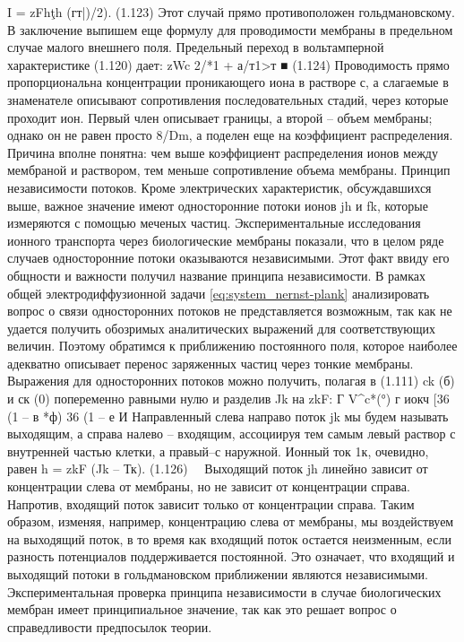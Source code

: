 I = zFh\c th (гт|)/2). (1.123)
Этот случай прямо противоположен гольдмановскому.
В заключение выпишем еще формулу для проводимости мембраны в предельном случае малого внешнего поля. Предельный переход в вольтамперной характеристике (1.120) дает:
zWc
2/*1 + а/т1>т ■ (1.124)
Проводимость прямо пропорциональна концентрации проникающего иона в растворе с, а слагаемые в знаменателе описывают сопротивления последовательных стадий, через которые проходит ион. Первый член описывает границы, а второй -- объем мембраны; однако он не равен просто 8/Dm, а поделен еще на коэффициент распределения. Причина вполне понятна: чем выше коэффициент распределения ионов между мембраной и раствором, тем меньше сопротивление объема мембраны.
Принцип независимости потоков. Кроме электрических характеристик, обсуждавшихся выше, важное значение имеют односторонние потоки ионов jh и fk, которые измеряются с помощью меченых частиц. Экспериментальные исследования ионного транспорта через биологические мембраны показали, что в целом ряде случаев односторонние потоки оказываются независимыми. Этот факт ввиду его общности и важности получил название принципа независимости.
В рамках общей электродиффузионной задачи \eqref{eq:system_nernst-plank} анализировать вопрос о связи односторонних потоков не представляется возможным, так как не удается получить обозримых аналитических выражений для соответствующих величин. Поэтому обратимся к приближению постоянного поля, которое наиболее адекватно описывает перенос заряженных частиц через тонкие мембраны. Выражения для односторонних потоков можно получить, полагая в (1.111) ck (б) и ск (0) попеременно равными нулю и разделив Jk на zkF:
Г V^c*(°) г иокч
[36 (1 -- в *ф) 36 (1 -- е И
Направленный слева направо поток jk мы будем называть выходящим, а справа налево -- входящим, ассоциируя тем самым левый раствор с внутренней частью клетки, а правый--с наружной. Ионный ток 1к, очевидно, равен
h = zkF (Jk -- Тк). (1.126) 
Выходящий поток jh линейно зависит от концентрации слева от мембраны, но не зависит от концентрации справа. Напротив, входящий поток зависит только от концентрации справа. Таким образом, изменяя, например, концентрацию слева от мембраны, мы воздействуем на выходящий поток, в то время как входящий поток остается неизменным, если разность потенциалов поддерживается постоянной. Это означает, что входящий и выходящий потоки в гольдмановском приближении являются независимыми. Экспериментальная проверка принципа независимости в случае биологических мембран имеет принципиальное значение, так как это решает вопрос о справедливости предпосылок теории.
